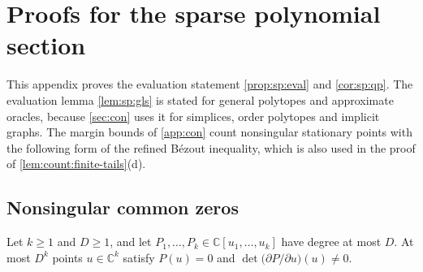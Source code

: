 \section{Proofs for the sparse polynomial section}\label{app:sp}

This appendix proves the evaluation statement \cref{prop:sp:eval} and
\cref{cor:sp:qp}. The evaluation lemma \cref{lem:sp:gls} is stated for
general polytopes and approximate oracles, because \cref{sec:con} uses it for
simplices, order polytopes and implicit graphs. The margin bounds of
\cref{app:con} count nonsingular stationary points with the following form of
the refined B\'ezout inequality, which is also used in the proof of
\cref{lem:count:finite-tails}(d).

\subsection{Nonsingular common zeros}\label{app:sp:bezout}

\begin{lemma}\label{lem:sp:bezout}
Let $k\ge1$ and $D\ge1$, and let $P_1,\dots,P_k\in\mathbb C[u_1,\dots,u_k]$
have degree at most $D$. At most $D^k$ points $u\in\mathbb C^k$ satisfy
$P(u)=0$ and $\det\bigl(\partial P/\partial u\bigr)(u)\ne0$.
\end{lemma}


